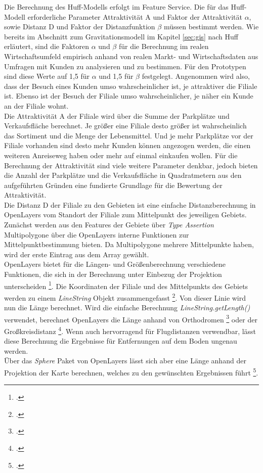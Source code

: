Die Berechnung des Huff-Modells erfolgt im Feature Service.
Die für das Huff-Modell erforderliche Parameter Attraktivität A und Faktor der Attraktivität $\alpha$, sowie Distanz D und Faktor der Distanzfunktion $\beta$ müssen bestimmt werden.
Wie bereits im Abschnitt zum Gravitationsmodell im Kapitel \ref{sec:gis} nach Huff erläutert, sind die Faktoren $\alpha$ und $\beta$ für die Berechnung im realen Wirtschaftsumfeld empirisch anhand von realen Markt- und Wirtschaftsdaten aus Umfragen mit Kunden zu analysieren und zu bestimmen.
Für den Prototypen sind diese Werte auf 1,5 für $\alpha$ und 1,5 für $\beta$ festgelegt.
Angenommen wird also, dass der Besuch eines Kunden umso wahrscheinlicher ist, je attraktiver die Filiale ist.
Ebenso ist der Besuch der Filiale umso wahrscheinlicher, je näher ein Kunde an der Filiale wohnt.\\
Die Attraktivität A der Filiale wird über die Summe der Parkplätze und Verkaufsfläche berechnet.
Je größer eine Filiale desto größer ist wahrscheinlich das Sortiment und die Menge der Lebensmittel.
Und je mehr Parkplätze vor der Filiale vorhanden sind desto mehr Kunden können angezogen werden, die einen weiteren Anreiseweg haben oder mehr auf einmal einkaufen wollen.
Für die Berechnung der Attraktivität sind viele weitere Parameter denkbar, jedoch bieten die Anzahl der Parkplätze und die Verkaufsfläche in Quadratmetern aus den aufgeführten Gründen eine fundierte Grundlage für die Bewertung der Attraktivität.\\
Die Distanz D der Filiale zu den Gebieten ist eine einfache Distanzberechnung in OpenLayers vom Standort der Filiale zum Mittelpunkt des jeweiligen Gebiets.
Zunächst werden aus den Features der Gebiete über \emph{Type Assertion} Multipolygone über die OpenLayers interne Funktionen zur Mittelpunktbestimmung bieten.
Da Multipolygone mehrere Mittelpunkte haben, wird der erste Eintrag aus dem Array gewählt.\\
OpenLayers bietet für die Längen- und Größenberechnung verschiedene Funktionen, die sich in der Berechnung unter Einbezug der Projektion unterscheiden \footcite{openlayers_measure_example}.
Die Koordinaten der Filiale und des Mittelpunkts des Gebiets werden zu einem \emph{LineString} Objekt zusammengefasst \footcite{openlayers_linestring}.
Von dieser Linie wird nun die Länge berechnet.
Wird die einfache Berechnung \emph{LineString.getLength()} verwendet, berechnet OpenLayers die Länge anhand von Orthodromen \footcite{orthodrome_frassek} oder der Großkreisdistanz \footcite{great_circle_distance}.
Wenn auch hervorragend für Flugdistanzen verwendbar, lässt diese Berechnung die Ergebnisse für Entfernungen auf dem Boden ungenau werden.\\
Über das \emph{Sphere} Paket von OpenLayers lässt sich aber eine Länge anhand der Projektion der Karte berechnen, welches zu den gewünschten Ergebnissen führt \footcite{openlayers_sphere}.

